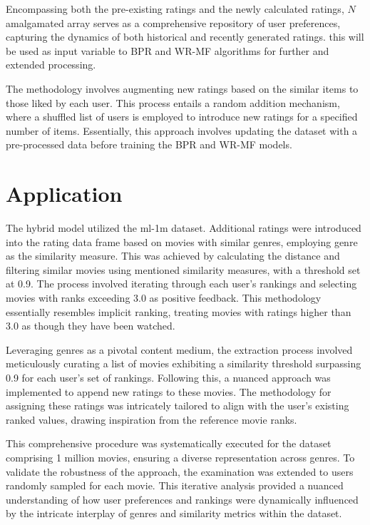 \documentclass[journal]{IEEEtran}
\begin{document}
Encompassing both the pre-existing ratings and the newly calculated ratings, \(N\) amalgamated array serves as a comprehensive 
repository of user preferences, capturing the dynamics of both historical and recently generated ratings. this will be used as
input variable to BPR and WR-MF algorithms for further and extended processing.

The methodology involves augmenting new ratings based on the similar items to those liked by each user. This process entails a 
random addition mechanism, where a shuffled list of users is employed to introduce new ratings for a specified number of items. 
Essentially, this approach involves updating the dataset with a pre-processed data before training the BPR and WR-MF models.

\section{Application}

The hybrid model utilized the ml-1m dataset. Additional ratings were introduced into the rating data frame based on movies with 
similar genres, employing genre as the similarity measure. This was achieved by calculating the distance and filtering similar 
movies using mentioned similarity measures, with a threshold set at 0.9. The process involved iterating through each 
user's rankings and selecting movies with ranks exceeding 3.0 as positive feedback. This methodology essentially resembles 
implicit ranking, treating movies with ratings higher than 3.0 as though they have been watched.

Leveraging genres as a pivotal content medium, the extraction process involved meticulously curating a list of movies exhibiting a 
similarity threshold surpassing 0.9 for each user's set of rankings. Following this, a nuanced approach was implemented to append 
new ratings to these movies. The methodology for assigning these ratings was intricately tailored to align with the user's existing 
ranked values, drawing inspiration from the reference movie ranks.

This comprehensive procedure was systematically executed for the dataset comprising 1 million movies, ensuring a diverse representation 
across genres. To validate the robustness of the approach, the examination was extended to users randomly sampled for each movie. 
This iterative analysis provided a nuanced understanding of how user preferences and rankings were dynamically influenced by the 
intricate interplay of genres and similarity metrics within the dataset.
\end{document}
